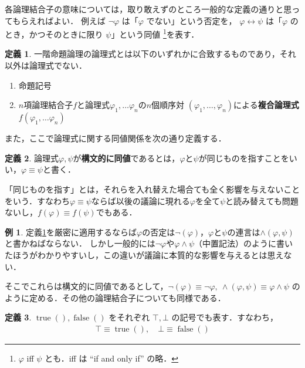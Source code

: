 \documentclass[uplatex,a4paper,dvipdfmx]{jsarticle}
\DeclareMathOperator{\true}{\mathrm{true}}
\DeclareMathOperator{\false}{\mathrm{false}}
\theoremstyle{definition}
\newtheorem{dfn}{定義}
\newtheorem{example}{例}
\begin{document}
        各論理結合子の意味については，取り敢えずのところ一般的な定義の通りと思ってもらえればよい．
        例えば $\lnot \varphi$ は「$\varphi$ でない」という否定を， $\varphi \leftrightarrow \psi$ は「$\varphi$ のとき，かつそのときに限り $\psi$」という同値
        \footnote{$\varphi$ iff $\psi$ とも．iff は ``if and only if'' の略．}を表す．

        \begin{dfn}\label{dfn:formula}
            一階命題論理の論理式とは以下のいずれかに合致するものであり，それ以外は論理式でない．
            \begin{enumerate}
                \item 命題記号
                \item $n$項論理結合子$f$と論理式$\varphi_1, \ldots \varphi_n$の$n$個順序対
                    $(\varphi_1, \ldots, \varphi_n)$による\textbf{複合論理式}$f(\varphi_1, \ldots \varphi_n)$
            \end{enumerate}
        \end{dfn}

        また，ここで論理式に関する同値関係を次の通り定義する．
        \begin{dfn}\label{dfn:syntactical}
            論理式$\varphi, \psi$が\textbf{構文的に同値}であるとは，$\varphi$と$\psi$が同じものを指すことをいい，$\varphi \equiv \psi$と書く．
        \end{dfn}

        「同じものを指す」とは，それらを入れ替えた場合ても全く影響を与えないことをいう．すなわち$\varphi \equiv \psi$ならば以後の議論に現れる$\varphi$を全て$\psi$と読み替えても問題ないし，$f(\varphi) \equiv f(\psi)$でもある．
        \begin{example}
            定義\ref{dfn:formula}を厳密に適用するならば$\varphi$の否定は$\lnot(\varphi)$，$\varphi$と$\psi$の連言は$\land(\varphi, \psi)$と書かねばならない．
            しかし一般的には$\lnot \varphi$や$\varphi \land \psi$（中置記法）のように書いたほうがわかりやすいし，この違いが議論に本質的な影響を与えるとは思えない．

             そこでこれらは構文的に同値であるとして，$\lnot(\varphi) \equiv \lnot\varphi,\ \land(\varphi, \psi) \equiv \varphi \land \psi$ のように定める．その他の論理結合子についても同様である．
        \end{example}
        \begin{dfn}
            $\true(), \false()$ をそれぞれ $\top, \bot$ の記号でも表す．すなわち，
            \begin{gather*}
                \top \equiv \true(),\quad \bot \equiv \false()
            \end{gather*}
        \end{dfn}
\end{document}
